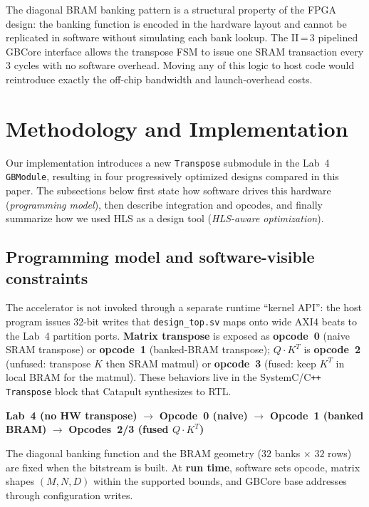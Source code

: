 \documentclass[11pt]{article}
\begin{document}
The diagonal BRAM banking pattern is a structural property of the
FPGA design: the banking function is encoded in the hardware layout and cannot be replicated in software without simulating each bank lookup. The II\,=\,3 pipelined GBCore interface allows the transpose FSM to issue one SRAM transaction every 3 cycles with no software overhead. Moving any of this logic to host code would reintroduce exactly the off-chip bandwidth and launch-overhead costs.


\section{Methodology and Implementation}
\label{sec:methodology}

Our implementation introduces a new \texttt{Transpose} submodule in the
Lab~4 \texttt{GBModule}, resulting in four progressively optimized designs
compared in this paper. The subsections below first state how software
drives this hardware (\emph{programming model}), then describe integration
and opcodes, and finally summarize how we used HLS as a design tool
(\emph{HLS-aware optimization}).

\subsection{Programming model and software-visible constraints}

The accelerator is not invoked through a separate runtime ``kernel API'':
the host program issues 32-bit writes that \texttt{design\_top.sv} maps onto wide AXI4 beats to the Lab~4 partition ports.
\textbf{Matrix transpose} is exposed as \textbf{opcode~0} (naive SRAM
transpose) or \textbf{opcode~1} (banked-BRAM transpose); \textbf{$Q\!\cdot\!K^T$} is \textbf{opcode~2} (unfused: transpose $K$ then SRAM matmul) or \textbf{opcode~3} (fused: keep $K^T$ in local BRAM for the matmul). These behaviors live in the SystemC/C\texttt{++} \texttt{Transpose} block that Catapult synthesizes to RTL.

\begin{center}
\textbf{Lab~4 (no HW transpose)} $\to$
\textbf{Opcode~0 (naive)} $\to$
\textbf{Opcode~1 (banked BRAM)} $\to$
\textbf{Opcodes~2/3 (fused $Q\!\cdot\!K^T$)}
\end{center}

The diagonal banking function and the BRAM geometry ($32$ banks $\times$ $32$ rows) are fixed when the bitstream is built. At \textbf{run time}, software sets opcode, matrix shapes $(M,N,D)$ within the supported bounds, and GBCore base addresses through configuration writes.
\end{document}
